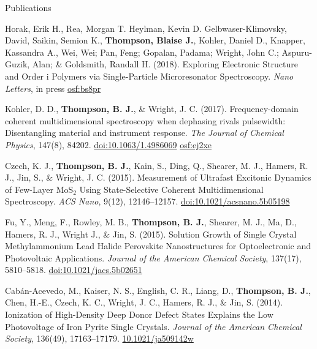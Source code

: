 \documentclass{resume}  %
\begin{document}
\begin{rSection}{Publications}
  \begin{etaremune}[leftmargin = 1.75em]
    \item Horak, Erik H., Rea, Morgan T. Heylman, Kevin D. Gelbwaser-Klimovsky, David, Saikin,
      Semion K., \textbf{Thompson, Blaise J.}, Kohler, Daniel D., Knapper, Kassandra A., Wei, Wei;
      Pan, Feng; Gopalan, Padama; Wright, John C.; Aspuru-Guzik, Alan; \& Goldsmith, Randall H.
      (2018).
      Exploring Electronic Structure and Order i Polymers via Single-Particle Microresonator
      Spectroscopy.
      \textit{Nano Letters}, in press
      \href{https://osf.io/bs8pr/}{osf:bs8pr}
    \item Kohler, D. D., \textbf{Thompson, B. J.}, \& Wright, J. C. (2017). Frequency-domain
      coherent multidimensional spectroscopy when dephasing rivals pulsewidth:
      Disentangling material and instrument response.
      \textit{The Journal of Chemical Physics}, 147(8), 84202.
      \href{https://doi.org/10.1063/1.4986069}{doi:10.1063/1.4986069}
      \href{https://osf.io/ej2xe/}{osf:ej2xe}
    \item Czech, K. J., \textbf{Thompson, B. J.}, Kain, S., Ding, Q., Shearer, M. J., Hamers,
      R. J., Jin, S., \& Wright, J. C. (2015). Measurement of Ultrafast Excitonic Dynamics of
      Few-Layer MoS$_2$ Using State-Selective Coherent Multidimensional Spectroscopy.
      \textit{ACS Nano}, 9(12), 12146–12157.
      \href{https://doi.org/10.1021/acsnano.5b05198}{doi:10.1021/acsnano.5b05198}
    \item Fu, Y., Meng, F., Rowley, M. B., \textbf{Thompson, B. J.}, Shearer, M. J.,
      Ma, D., Hamers, R. J., Wright J., \& Jin, S. (2015). Solution Growth of Single Crystal
      Methylammonium Lead Halide Perovskite Nanostructures for Optoelectronic and
      Photovoltaic Applications.
      \textit{Journal of the American Chemical Society}, 137(17), 5810–5818.
      \href{https://doi.org/10.1021/jacs.5b02651}{doi:10.1021/jacs.5b02651}
    \item Cabán-Acevedo, M., Kaiser, N. S., English, C. R., Liang, D., \textbf{Thompson, B. J.},
      Chen, H.-E., Czech, K. C., Wright, J. C., Hamers, R. J., \& Jin, S. (2014).
      Ionization of High-Density Deep Donor Defect States Explains the Low
      Photovoltage of Iron Pyrite Single Crystals.
      \textit{Journal of the American Chemical Society}, 136(49), 17163–17179.
      \href{https://doi.org/10.1021/ja509142w}{10.1021/ja509142w}
  \end{etaremune}
\end{rSection}
\end{document}
